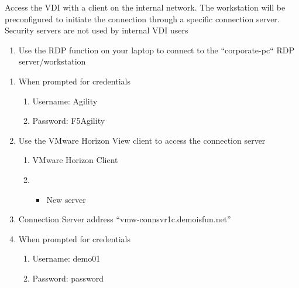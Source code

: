 \documentclass[letterpaper,10pt,english]{sphinxmanual}
\begin{document}
Access the VDI with a client on the internal network. The workstation
will be preconfigured to initiate the connection through a specific
connection server. Security servers are not used by internal VDI users
\begin{enumerate}
\item {} 
Use the RDP function on your laptop to connect to the “corporate-pc“
RDP server/workstation

\end{enumerate}
\begin{quote}

\end{quote}
\begin{enumerate}
\item {} 
When prompted for credentials
\begin{enumerate}
\item {} 
Username: Agility

\item {} 
Password: F5Agility


\end{enumerate}

\item {} 
Use the VMware Horizon View client to access the connection server
\begin{enumerate}
\item {} 
VMware Horizon Client

\item {} \begin{itemize}
\item {} 
New server

\end{itemize}

\end{enumerate}

\item {} 
Connection Server address “vmw-connsvr1c.demoisfun.net”

\item {} 
When prompted for credentials
\begin{enumerate}
\item {} 
Username: demo01

\item {} 
Password: password

\end{enumerate}


\end{enumerate}
\end{document}
